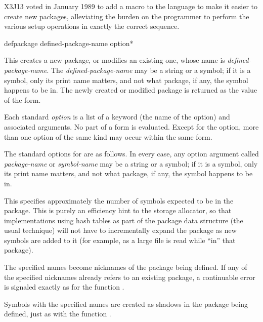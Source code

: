 \begin{new}
X3J13 voted in January 1989
to add a macro  to the
language to make it easier to create new packages, alleviating the burden
on the programmer to perform the various setup operations in exactly the
correct sequence.

\begin{defmac}
defpackage defined-package-name {option}*

This creates a new package, or modifies an existing one, whose name
is \emph{defined-package-name}.  The \emph{defined-package-name}
may be a string or a symbol;
if it is a symbol, only its print name matters, and not what package, if any,
the symbol happens to be in.
The newly created or modified package is returned as the value of
the  form.

Each standard \emph{option} is a list of a keyword (the name of the option)
and associated arguments.  No part of a  form is evaluated.
Except for the  option, more than one option of the same
kind may occur within the same  form.

The standard options for  are as follows.
In every case, any option argument called \emph{package-name}
or \emph{symbol-name}
may be a string or a symbol;
if it is a symbol, only its print name matters, and not what package, if any,
the symbol happens to be in.

\begin{flushdesc}
\item[\cd{(:size \emph{integer})}]
This specifies approximately the number of symbols expected to be in the
package.  This is purely an efficiency hint to the storage allocator,
so that implementations using hash tables as part
of the package data structure (the usual technique) will not
have to incrementally expand the package as new symbols are added to it
(for example, as a large file is read while ``in'' that package).

\item[\cd{(:nicknames \Mstar\emph{package-name})}]
The specified names become nicknames of the package being defined.
If any of the specified nicknames already refers to an existing
package, a continuable error is signaled exactly as for the
function .

\item[\cd{(:shadow \Mstar\emph{symbol-name})}]
Symbols with the specified names are created as shadows
in the package being defined, just as with the function .


\end{flushdesc}
\end{defmac}
\end{new}
